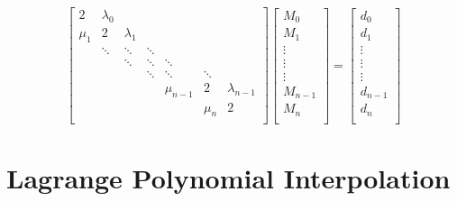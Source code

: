 \documentclass{article}
\begin{document}
 
\begin{equation*}
  \begin{bmatrix}
    2 & \lambda_0 \\ 
    \mu_1 & 2 & \lambda_1 \\ 
    & \ddots & \ddots & \ddots \\
    && \ddots & \ddots & \ddots \\
	&&& \ddots & \ddots & \ddots \\
	&&&& \mu_{n-1} & 2 & \lambda_{n-1} \\ 
	&&&&& \mu_{n} & 2 \\ 
  \end{bmatrix}
   \begin{bmatrix}
    M_0 \\
    M_1 \\
    \vdots \\
    \vdots \\
    \vdots \\
    M_{n-1} \\
    M_n \\
  \end{bmatrix} 
  =
  \begin{bmatrix}
    d_0 \\
    d_1 \\
    \vdots \\
    \vdots \\
    \vdots \\
    d_{n-1} \\
    d_n \\
  \end{bmatrix} 
\end{equation*}

 \newpage
\section*{Lagrange Polynomial Interpolation}
\end{document}

